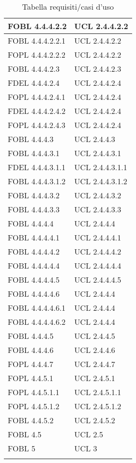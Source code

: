 \begin{longtable}{XX}
\midrule
FOBL 4.4.4.2.2&UCL 2.4.4.2.2\\
\midrule
FOBL 4.4.4.2.2.1&UCL 2.4.4.2.2\\
\midrule
FOPL 4.4.4.2.2.2&UCL 2.4.4.2.2\\
\midrule
FOBL 4.4.4.2.3&UCL 2.4.4.2.3\\
\midrule
FDEL 4.4.4.2.4&UCL 2.4.4.2.4\\
\midrule
FOPL 4.4.4.2.4.1&UCL 2.4.4.2.4\\
\midrule
FDEL 4.4.4.2.4.2&UCL 2.4.4.2.4\\
\midrule
FOPL 4.4.4.2.4.3&UCL 2.4.4.2.4\\
\midrule
FOBL 4.4.4.3&UCL 2.4.4.3\\
\midrule
FOBL 4.4.4.3.1&UCL 2.4.4.3.1\\
\midrule
FDEL 4.4.4.3.1.1&UCL 2.4.4.3.1.1\\
\midrule
FOBL 4.4.4.3.1.2&UCL 2.4.4.3.1.2\\
\midrule
FOBL 4.4.4.3.2&UCL 2.4.4.3.2\\
\midrule
FOBL 4.4.4.3.3&UCL 2.4.4.3.3\\
\midrule
FOBL 4.4.4.4&UCL 2.4.4.4\\
\midrule
FOBL 4.4.4.4.1&UCL 2.4.4.4.1\\
\midrule
FOBL 4.4.4.4.2&UCL 2.4.4.4.2\\
\midrule
FOBL 4.4.4.4.4&UCL 2.4.4.4.4\\
\midrule
FOBL 4.4.4.4.5&UCL 2.4.4.4.5\\
\midrule
FOBL 4.4.4.4.6&UCL 2.4.4.4\\
\midrule
FOBL 4.4.4.4.6.1&UCL 2.4.4.4\\
\midrule
FOBL 4.4.4.4.6.2&UCL 2.4.4.4\\
\midrule
FOBL 4.4.4.5&UCL 2.4.4.5\\
\midrule
FOBL 4.4.4.6&UCL 2.4.4.6\\
\midrule
FOPL 4.4.4.7&UCL 2.4.4.7\\
\midrule
FOPL 4.4.5.1&UCL 2.4.5.1\\
\midrule
FOPL 4.4.5.1.1&UCL 2.4.5.1.1\\
\midrule
FOPL 4.4.5.1.2&UCL 2.4.5.1.2\\
\midrule
FOBL 4.4.5.2&UCL 2.4.5.2\\
\midrule
FOBL 4.5&UCL 2.5\\
\midrule
FOBL 5&UCL 3\\ 
\bottomrule
\caption{Tabella requisiti/casi d'uso}
\end{longtable}
